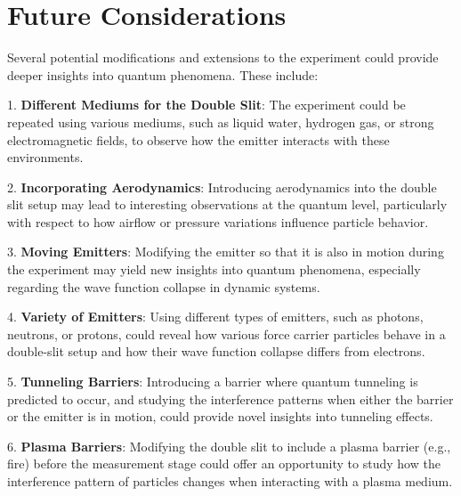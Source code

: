 \documentclass{article}
\begin{document}
\section{Future Considerations}

Several potential modifications and extensions to the experiment could provide deeper insights into quantum phenomena. These include:

1. \textbf{Different Mediums for the Double Slit}: The experiment could be repeated using various mediums, such as liquid water, hydrogen gas, or strong electromagnetic fields, to observe how the emitter interacts with these environments. 

2. \textbf{Incorporating Aerodynamics}: Introducing aerodynamics into the double slit setup may lead to interesting observations at the quantum level, particularly with respect to how airflow or pressure variations influence particle behavior.

3. \textbf{Moving Emitters}: Modifying the emitter so that it is also in motion during the experiment may yield new insights into quantum phenomena, especially regarding the wave function collapse in dynamic systems.

4. \textbf{Variety of Emitters}: Using different types of emitters, such as photons, neutrons, or protons, could reveal how various force carrier particles behave in a double-slit setup and how their wave function collapse differs from electrons.

5. \textbf{Tunneling Barriers}: Introducing a barrier where quantum tunneling is predicted to occur, and studying the interference patterns when either the barrier or the emitter is in motion, could provide novel insights into tunneling effects.

6. \textbf{Plasma Barriers}: Modifying the double slit to include a plasma barrier (e.g., fire) before the measurement stage could offer an opportunity to study how the interference pattern of particles changes when interacting with a plasma medium.



\end{document}
